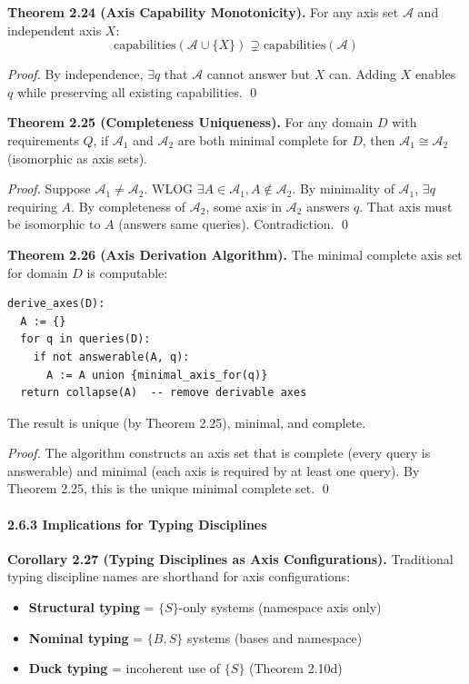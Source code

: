 \textbf{Theorem 2.24 (Axis Capability Monotonicity).} For any axis set \(\mathcal{A}\) and independent axis \(X\):
\[\text{capabilities}(\mathcal{A} \cup \{X\}) \supsetneq \text{capabilities}(\mathcal{A})\]

\emph{Proof.} By independence, \(\exists q\) that \(\mathcal{A}\) cannot answer but \(X\) can. Adding \(X\) enables \(q\) while preserving all existing capabilities. \qed

\textbf{Theorem 2.25 (Completeness Uniqueness).} For any domain \(D\) with requirements \(Q\), if \(\mathcal{A}_1\) and \(\mathcal{A}_2\) are both minimal complete for \(D\), then \(\mathcal{A}_1 \cong \mathcal{A}_2\) (isomorphic as axis sets).

\emph{Proof.} Suppose \(\mathcal{A}_1 \neq \mathcal{A}_2\). WLOG \(\exists A \in \mathcal{A}_1, A \notin \mathcal{A}_2\). By minimality of \(\mathcal{A}_1\), \(\exists q\) requiring \(A\). By completeness of \(\mathcal{A}_2\), some axis in \(\mathcal{A}_2\) answers \(q\). That axis must be isomorphic to \(A\) (answers same queries). Contradiction. \qed

\textbf{Theorem 2.26 (Axis Derivation Algorithm).} The minimal complete axis set for domain \(D\) is computable:
\begin{verbatim}
derive_axes(D):
  A := {}
  for q in queries(D):
    if not answerable(A, q):
      A := A union {minimal_axis_for(q)}
  return collapse(A)  -- remove derivable axes
\end{verbatim}
The result is unique (by Theorem 2.25), minimal, and complete.

\emph{Proof.} The algorithm constructs an axis set that is complete (every query is answerable) and minimal (each axis is required by at least one query). By Theorem 2.25, this is the unique minimal complete set. \qed

\paragraph{2.6.3 Implications for Typing Disciplines}\label{axis-implications}

\textbf{Corollary 2.27 (Typing Disciplines as Axis Configurations).} Traditional typing discipline names are shorthand for axis configurations:
\begin{itemize}
\item \textbf{Structural typing} = \(\{S\}\)-only systems (namespace axis only)
\item \textbf{Nominal typing} = \(\{B, S\}\) systems (bases and namespace)
\item \textbf{Duck typing} = incoherent use of \(\{S\}\) (Theorem 2.10d)
\end{itemize}


